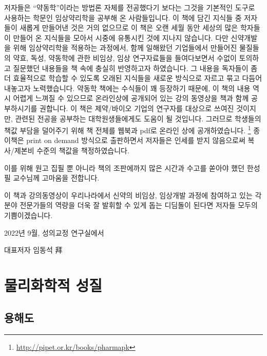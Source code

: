 \documentclass[
  11pt,
  krantz2, a4paper, twoside]{krantz}
\begin{document}
저자들은 ``약동학''이라는 방법론 자체를 전공했다기 보다는 그것을 기본적인
도구로 사용하는 학문인 임상약리학을 공부해 온 사람들입니다. 이 책에 담긴
지식들 중 저자들이 새롭게 만들어낸 것은 거의 없으므로 이 책은 오랜 세월
동안 세상의 많은 학자들이 만들어 온 지식들을 모아서 시중에 유통시킨 것에
지나지 않습니다. 다만 신약개발을 위해 임상약리학을 적용하는 과정에서,
함께 일해왔던 기업들에서 만들어진 물질들의 약효, 독성, 약동학에 관한
비임상, 임상 연구자료들을 들여다보면서 수없이 토의하고 질문했던 내용들을
책 속에 충실히 반영하고자 하였습니다. 그 내용을 독자들이 좀 더
효율적으로 학습할 수 있도록 오래된 지식들을 새로운 방식으로 자르고 묶고
다듬어 내놓고자 노력했습니다. 약동학 책에는 수식들이 꽤 등장하기 때문에, 이 책의 내용 역시 어렵게 느껴질 수 있으므로 온라인상에 공개되어 있는 강의 동영상을 책과 함께 공부하시기를 권합니다.
이 책은 제약/바이오 기업의 연구자를 대상으로 쓰여진 것이지만, 관련된 전공을 공부하는 대학원생들에게도 도움이 될 것입니다.
그러므로 학생들의 책값 부담을 덜어주기 위해 책 전체를 웹북과 pdf로 온라인 상에 공개하였습니다. \footnote{\url{http://pipet.or.kr/books/pharmapk}}
종이책은 print on demand 방식으로 출판하면서 저자들은 인세를 받지 않음으로써 복사/제본비 수준의 책값을 책정하였습니다.

이를 위해 원고 집필 뿐 아니라 책의 조판에까지 많은 시간과 수고를 쏟아야 했던 한성필 교수님께 고마움을 전합니다.

이 책과 강의동영상이 우리나라에서 신약의 비임상, 임상개발 과정에 참여하고 있는 각 분야 전문가들의 역량을 더욱 잘 발휘할 수 있게 돕는 디딤돌이 된다면 저자들 모두의 기쁨이겠습니다.

\hfill 2022년 9월, 성의교정 연구실에서

\hfill 대표저자 임동석 拜

\normalsize

\mainmatter

\hypertarget{part-uxbb3cuxb9acuxd654uxd559uxc801-uxc131uxc9c8}{%
\part{물리화학적 성질}\label{part-uxbb3cuxb9acuxd654uxd559uxc801-uxc131uxc9c8}}

\hypertarget{uxc6a9uxd574uxb3c4}{%
\chapter{용해도}\label{uxc6a9uxd574uxb3c4}}

\Large\hfill
\end{document}
